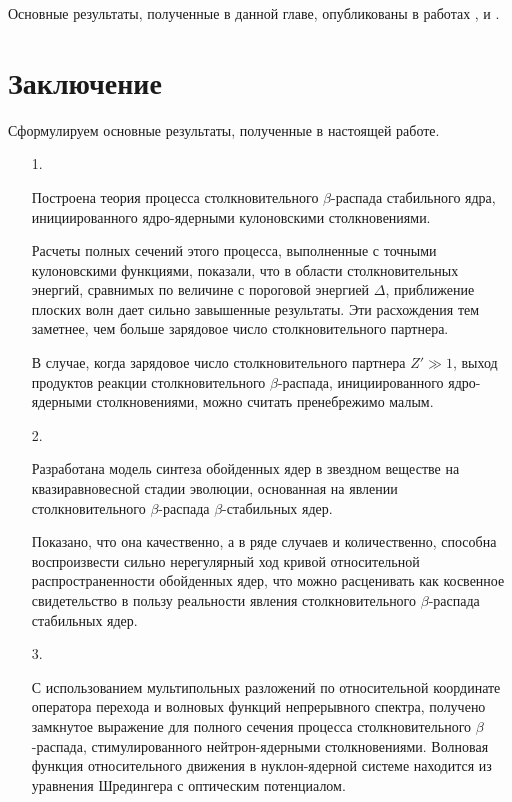 \enlargethispage{\baselineskip}

Основные результаты, полученные в данной главе, опубликованы в работах
\cite{K1, K2, K3, K4}, \cite{K5, K6, K7} и \cite{K9}.



\chapter*{Заключение}



Сформулируем основные результаты, полученные в настоящей работе.

\begin{itemize}

\item[1.]

Построена теория
процесса столкновительного $\beta$-распада стабильного ядра, инициированного
ядро-ядерными кулоновскими столкновениями.

Расчеты полных сечений этого процесса, выполненные с точными кулоновскими
функциями, показали, что
в области столкновительных энергий, сравнимых по величине с пороговой
энергией $\Delta$,
приближение плоских волн дает сильно завышенные результаты. Эти расхождения
тем заметнее, чем больше зарядовое число столкновительного партнера.

В случае, когда зарядовое число столкновительного партнера $Z'\gg 1$, выход
продуктов реакции столкновительного $\beta$-распада, инициированного
ядро-ядерными столкновениями, можно считать пренебрежимо малым.


\item[2.]

Разработана модель синтеза обойденных ядер в звездном веществе на
квазиравновесной стадии эволюции, основанная на явлении столкновительного
$\beta$-распада $\beta$-стабильных ядер.

Показано, что она качественно, а в ряде случаев и количественно, способна
воспроизвести сильно нерегулярный ход кривой относительной распространенности
обойденных ядер, что можно расценивать как косвенное свидетельство в пользу
реальности явления столкновительного $\beta$-распада стабильных ядер.

\item[3.]

С использованием мультипольных разложений по относительной координате оператора
перехода и волновых функций непрерывного спектра,
получено замкнутое выражение для полного сечения процесса столкновительного
$\beta$-распада, стимулированного нейтрон-ядерными столкновениями.
Волновая функция относительного движения в нуклон-ядерной системе находится из
уравнения Шредингера с оптическим потенциалом.


\end{itemize}

